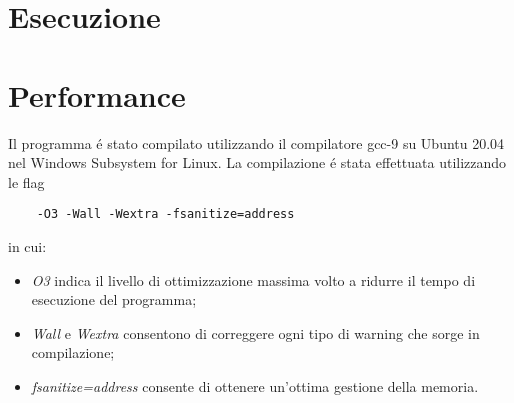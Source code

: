 \documentclass[../main.tex]{subfiles}
\begin{document}
\section{Esecuzione}

\section{Performance}
Il programma \'e stato compilato utilizzando il compilatore gcc-9 su Ubuntu 20.04 nel Windows Subsystem for Linux.
La compilazione \'e stata effettuata utilizzando le flag
\begin{verbatim}
    -O3 -Wall -Wextra -fsanitize=address
\end{verbatim}
in cui:
\begin{itemize}
    \item \emph{O3} indica il livello di ottimizzazione massima volto a ridurre il tempo di esecuzione del programma;
    \item \emph{Wall} e \emph{Wextra} consentono di correggere ogni tipo di warning che sorge in compilazione;
    \item \emph{fsanitize=address} consente di ottenere un'ottima gestione della memoria.
\end{itemize}
\end{document}
